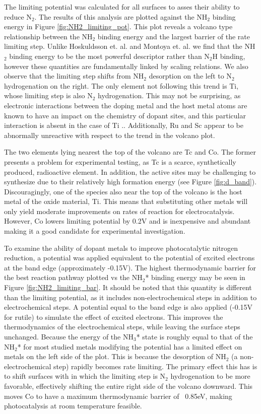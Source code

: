 The limiting potential was calculated for all surfaces to asses their ability to reduce N$_2$. The results of this analysis are plotted against the NH$_2$ binding energy in Figure \ref{fig:NH2_limiting_pot}. This plot reveals a volcano type relationship between the NH$_2$ binding energy and the largest barrier of the rate limiting step. Unlike Hoskuldsson et. al.\cite{Hoskuldsson_2017} and Montoya et. al. \cite{Montoya_2015} we find that the NH$_2$ binding energy to be the most powerful descriptor rather than N$_2$H binding, however these quantities are fundamentally linked by scaling relations. We also observe that the limiting step shifts from NH$_2$ desorption on the left to N$_2$ hydrogenation on the right. The only element not following this trend is Ti, whose limiting step is also N$_2$ hydrogenation. This may not be surprising, as electronic interactions between the doping metal and the host metal atoms are known to have an impact on the chemistry of dopant sites, and this particular interaction is absent in the case of Ti \cite{Xu_2015}.. Additionally, Ru and Sc appear to be abnormally unreactive with respect to the trend in the volcano plot.

The two elements lying nearest the top of the volcano are Tc and Co. The former presents a problem for experimental testing, as Tc is a scarce, synthetically produced, radioactive element. In addition, the active sites may be challenging to synthesize due to their relatively high formation energy (see Figure \ref{fig:d_band}). Discouragingly, one of the species also near the top of the volcano is the host metal of the oxide material, Ti. This means that substituting other metals will only yield moderate improvements on rates of reaction for electrocatalysis. However, Co lowers limiting potential by 0.2V and is inexpensive and abundant making it a good candidate for experimental investigation.


To examine the ability of dopant metals to improve photocatalytic nitrogen reduction, a potential was applied equivalent to the potential of excited electrons at the band edge (approximately -0.15V). The highest thermodynamic barrier for the best reaction pathway plotted vs the NH$_2$* binding energy may be seen in Figure \ref{fig:NH2_limiting_bar}. It should be noted that this quantity is different than the limiting potential, as it includes non-electrochemical steps in addition to electrochemical steps. A potential equal to the band edge is also applied (-0.15V for rutile) to simulate the effect of excited electrons. This improves the thermodynamics of the electrochemical steps, while leaving the surface steps unchanged. Because the energy of the NH$_3$* state is roughly equal to that of the NH$_2$* for most studied metals modifying the potential has a limited effect on metals on the left side of the plot. This is because the desorption of NH$_2$ (a non-electrochemical step) rapidly becomes rate limiting. The primary effect this has is to shift surfaces with in which the limiting step is N$_2$ hydrogenation to be more favorable, effectively shifting the entire right side of the volcano downward. This moves Co to have a maximum thermodynamic barrier of ~0.85eV, making photocatalysis at room temperature feasible.


